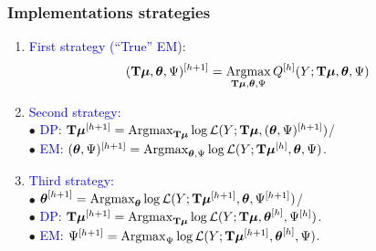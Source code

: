 \documentclass[compress]{beamer}
\newcommand{\argmax}{\operatornamewithlimits{Argmax}}
\newcommand{\mubf}{\text{\mathversion{bold}{$\mu$}}}
\newcommand{\thetabf}{\text{\mathversion{bold}{$\theta$}}}
\newcommand{\Tbf}{\textbf{T}}
\begin{document}
\begin{frame}
\frametitle{Implementations strategies}
\begin{enumerate}
\item<1-> \textcolor{blue}{First strategy (``True'' EM)}: 
\begin{eqnarray*}
(\Tbf\mubf,\thetabf,\Psi)^{[h+1]} =\argmax_{\Tbf\mubf,\thetabf,\Psi}Q^{[h]}(Y;\Tbf\mubf,\thetabf,\Psi)
\end{eqnarray*}
\item <3->\textcolor{blue}{Second strategy:}\\
\vspace{0.3cm}
$\bullet$ \textcolor{blue}{DP:} $\Tbf\mubf^{[h+1]}=\argmax_{\Tbf\mubf}\log\mathcal{L}(Y;\Tbf\mubf,(\thetabf,\Psi)^{[h+1]})$/\\
\vspace{0.2cm}
$\bullet$ \textcolor{blue}{EM:} $(\thetabf,\Psi)^{[h+1]}=\argmax_{\thetabf,\Psi}\log\mathcal{L}(Y;\Tbf\mubf^{[h]},\thetabf,\Psi)$.\\

\item<5-> \textcolor{blue}{Third strategy:}\\
\vspace{0.3cm}
$\bullet$ $\thetabf^{[h+1]}=\argmax_{\thetabf}\log\mathcal{L}(Y;\Tbf\mubf^{[h+1]},\thetabf,\Psi^{[h+1]})$/\\
\vspace{0.2cm}
$\bullet$ \textcolor{blue}{DP:} $\Tbf\mubf^{[h+1]}=\argmax_{\Tbf\mubf}\log\mathcal{L}(Y;\Tbf\mubf,\thetabf^{[h]},\Psi^{[h]})$.\\
\vspace{0.2cm}
$\bullet$ \textcolor{blue}{EM:} $\Psi^{[h+1]}=\argmax_{\Psi}\log\mathcal{L}(Y;\Tbf\mubf^{[h+1]},\thetabf^{[h]},\Psi)$. 
\end{enumerate}
\end{frame}

\end{document}
